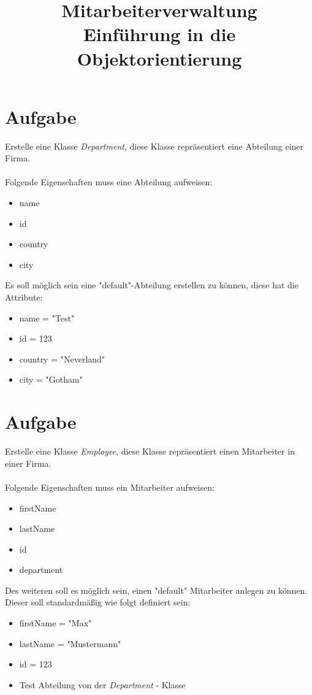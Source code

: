 \documentclass[12pt, oneside]{article}   	%
\title{
Mitarbeiterverwaltung \\
\vspace{0.3cm}
\large Einführung in die Objektorientierung
}
\date{}							%
\begin{document}
 \setlength{\parindent}{0em} 
\maketitle

\section{Aufgabe}

Erstelle eine Klasse \textit{Department}, diese Klasse repräsentiert eine Abteilung einer Firma. \\  \\
Folgende Eigenschaften muss eine Abteilung aufweisen:
\begin{itemize}
	\item name
	\item id
	\item country
	\item city
\end{itemize}
\vspace{0.5cm}

Es soll möglich sein eine "default"-Abteilung erstellen zu können, diese hat die \\ Attribute:
\begin{itemize}
	\item name = "Test"
	\item id = 123
	\item country = "Neverland"
	\item city = "Gotham"
\end{itemize}
\vspace{0.5cm}

\section{Aufgabe}

Erstelle eine Klasse \textit{Employee}, diese Klasse repräsentiert einen Mitarbeiter in einer Firma. \\  \\
Folgende Eigenschaften muss ein Mitarbeiter aufweisen:
\begin{itemize}
	\item firstName
	\item lastName
	\item id
	\item department
\end{itemize}
\vspace{0.5cm}

Des weiteren soll es möglich sein, einen "default" Mitarbeiter anlegen zu können. Dieser soll standardmäßig wie folgt definiert sein:
\begin{itemize}
	\item firstName = "Max"
	\item lastName = "Mustermann"
	\item id = 123
	\item Test Abteilung von der \textit{Department} - Klasse
\end{itemize}
\vspace{1cm}
\end{document}
